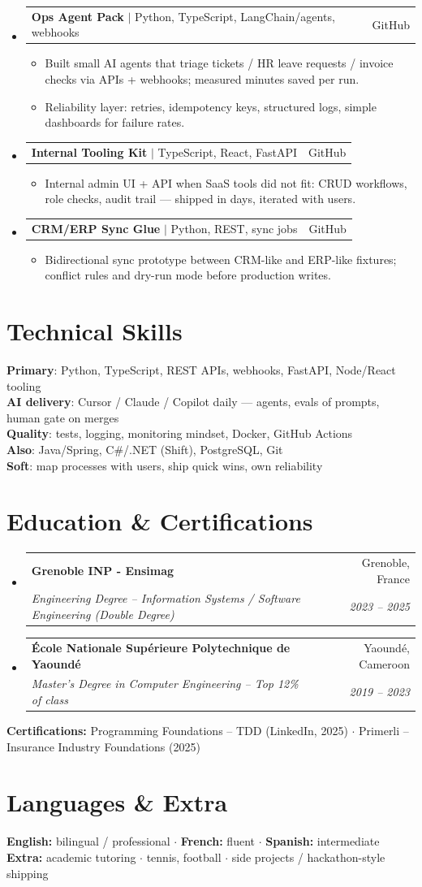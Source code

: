 \documentclass[letterpaper,10.5pt]{article}
\makeatletter
\newcommand{\resumeItem}[1]{\item\small{#1 \vspace{-1.5pt}}}
\newcommand{\resumeSubheading}[4]{
  \vspace{-1pt}\item
    \begin{tabular*}{0.97\textwidth}[t]{l@{\extracolsep{\fill}}r}
      \textbf{#1} & #2 \\
      \textit{\small#3} & \textit{\small #4} \\
    \end{tabular*}\vspace{-5pt}
}
\newcommand{\resumeProjectHeading}[2]{
    \item
    \begin{tabular*}{0.97\textwidth}{l@{\extracolsep{\fill}}r}
      \small#1 & #2 \\
    \end{tabular*}\vspace{-5pt}
}
\newcommand{\resumeSubHeadingListStart}{\begin{itemize}[leftmargin=0.15in, label={}]}
\newcommand{\resumeSubHeadingListEnd}{\end{itemize}}
\newcommand{\resumeItemListStart}{\begin{itemize}[leftmargin=0.18in]}
\newcommand{\resumeItemListEnd}{\end{itemize}\vspace{-3pt}}
\makeatother
\begin{document}
\resumeSubHeadingListStart

  \resumeProjectHeading
    {\textbf{Ops Agent Pack} $|$ Python, TypeScript, LangChain/agents, webhooks}{GitHub}
    \resumeItemListStart
      \resumeItem{Built small AI agents that triage tickets / HR leave requests / invoice checks via APIs + webhooks; measured minutes saved per run.}
      \resumeItem{Reliability layer: retries, idempotency keys, structured logs, simple dashboards for failure rates.}
    \resumeItemListEnd
  \resumeProjectHeading
    {\textbf{Internal Tooling Kit} $|$ TypeScript, React, FastAPI}{GitHub}
    \resumeItemListStart
      \resumeItem{Internal admin UI + API when SaaS tools did not fit: CRUD workflows, role checks, audit trail --- shipped in days, iterated with users.}
    \resumeItemListEnd
  \resumeProjectHeading
    {\textbf{CRM/ERP Sync Glue} $|$ Python, REST, sync jobs}{GitHub}
    \resumeItemListStart
      \resumeItem{Bidirectional sync prototype between CRM-like and ERP-like fixtures; conflict rules and dry-run mode before production writes.}
    \resumeItemListEnd
\resumeSubHeadingListEnd

\section{Technical Skills}

\begin{itemize}[leftmargin=0.15in, label={}]
  \small{\item{
\textbf{Primary}: Python, TypeScript, REST APIs, webhooks, FastAPI, Node/React tooling \\
\textbf{AI delivery}: Cursor / Claude / Copilot daily --- agents, evals of prompts, human gate on merges \\
\textbf{Quality}: tests, logging, monitoring mindset, Docker, GitHub Actions \\
\textbf{Also}: Java/Spring, C\#/.NET (Shift), PostgreSQL, Git \\
\textbf{Soft}: map processes with users, ship quick wins, own reliability
  }}
\end{itemize}

\section{Education \& Certifications}

\resumeSubHeadingListStart
  \resumeSubheading
    {Grenoble INP - Ensimag}{Grenoble, France}
    {Engineering Degree -- Information Systems / Software Engineering (Double Degree)}{2023 -- 2025}
  \resumeSubheading
    {\'Ecole Nationale Sup\'erieure Polytechnique de Yaound\'e}{Yaound\'e, Cameroon}
    {Master's Degree in Computer Engineering -- Top 12\% of class}{2019 -- 2023}
\resumeSubHeadingListEnd
\small{
\textbf{Certifications:} Programming Foundations -- TDD (LinkedIn, 2025) $\cdot$ Primerli -- Insurance Industry Foundations (2025)
}

\section{Languages \& Extra}
\small{
\textbf{English:} bilingual / professional $\cdot$ \textbf{French:} fluent $\cdot$ \textbf{Spanish:} intermediate \\
\textbf{Extra:} academic tutoring $\cdot$ tennis, football $\cdot$ side projects / hackathon-style shipping
}
\end{document}

